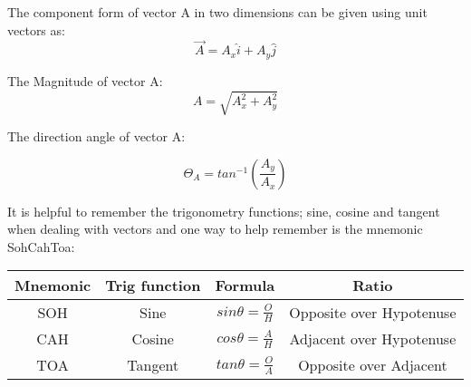 \documentclass[12pt, letterpaper, twoside]{article}
\begin{document}
The component form of vector A in two dimensions can be given using unit vectors as:
\begin{equation}
\overrightarrow{A} = A_x \hat{i} + A_y \hat{j}
\end{equation}




The Magnitude of vector A:
\begin{equation}
A = \sqrt{A_x^2 + A_y^2}
\end{equation}



The direction angle of vector A:

\begin{equation}
\Theta_A = tan^{-1} \left( \frac{A_y}{A_x} \right)
\end{equation}






\newpage

It is helpful to remember the trigonometry functions; sine, cosine and tangent when dealing with vectors and one way to help remember is the mnemonic SohCahToa:
$$ $$
\begin{tabular}{|c|c|c|c|}
	\hline 
	\rule[-1ex]{0pt}{2.5ex} Mnemonic & Trig function & Formula & Ratio \\ 
	\hline 
	\rule[-1ex]{0pt}{2.5ex} SOH & Sine & $sin\theta=\frac{O}{H}$ & Opposite over Hypotenuse \\ 
	\hline 
	\rule[-1ex]{0pt}{2.5ex} CAH & Cosine & $cos\theta=\frac{A}{H}$ & Adjacent over Hypotenuse \\ 
	\hline 
	\rule[-1ex]{0pt}{2.5ex} TOA & Tangent & $tan\theta=\frac{O}{A}$ & Opposite over Adjacent \\ 
	\hline 
\end{tabular} 


$$ $$

\end{document}
